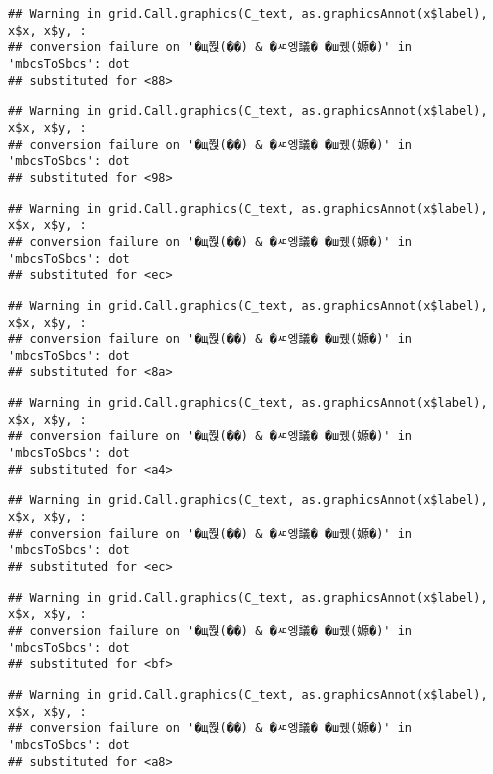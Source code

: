 \documentclass[
]{article}
\begin{document}
\begin{verbatim}
## Warning in grid.Call.graphics(C_text, as.graphicsAnnot(x$label), x$x, x$y, :
## conversion failure on '�щ쭩(��) & �ㅼ엥議� �ш퀬(嫄�)' in 'mbcsToSbcs': dot
## substituted for <88>
\end{verbatim}

\begin{verbatim}
## Warning in grid.Call.graphics(C_text, as.graphicsAnnot(x$label), x$x, x$y, :
## conversion failure on '�щ쭩(��) & �ㅼ엥議� �ш퀬(嫄�)' in 'mbcsToSbcs': dot
## substituted for <98>
\end{verbatim}

\begin{verbatim}
## Warning in grid.Call.graphics(C_text, as.graphicsAnnot(x$label), x$x, x$y, :
## conversion failure on '�щ쭩(��) & �ㅼ엥議� �ш퀬(嫄�)' in 'mbcsToSbcs': dot
## substituted for <ec>
\end{verbatim}

\begin{verbatim}
## Warning in grid.Call.graphics(C_text, as.graphicsAnnot(x$label), x$x, x$y, :
## conversion failure on '�щ쭩(��) & �ㅼ엥議� �ш퀬(嫄�)' in 'mbcsToSbcs': dot
## substituted for <8a>
\end{verbatim}

\begin{verbatim}
## Warning in grid.Call.graphics(C_text, as.graphicsAnnot(x$label), x$x, x$y, :
## conversion failure on '�щ쭩(��) & �ㅼ엥議� �ш퀬(嫄�)' in 'mbcsToSbcs': dot
## substituted for <a4>
\end{verbatim}

\begin{verbatim}
## Warning in grid.Call.graphics(C_text, as.graphicsAnnot(x$label), x$x, x$y, :
## conversion failure on '�щ쭩(��) & �ㅼ엥議� �ш퀬(嫄�)' in 'mbcsToSbcs': dot
## substituted for <ec>
\end{verbatim}

\begin{verbatim}
## Warning in grid.Call.graphics(C_text, as.graphicsAnnot(x$label), x$x, x$y, :
## conversion failure on '�щ쭩(��) & �ㅼ엥議� �ш퀬(嫄�)' in 'mbcsToSbcs': dot
## substituted for <bf>
\end{verbatim}

\begin{verbatim}
## Warning in grid.Call.graphics(C_text, as.graphicsAnnot(x$label), x$x, x$y, :
## conversion failure on '�щ쭩(��) & �ㅼ엥議� �ш퀬(嫄�)' in 'mbcsToSbcs': dot
## substituted for <a8>
\end{verbatim}
\end{document}
